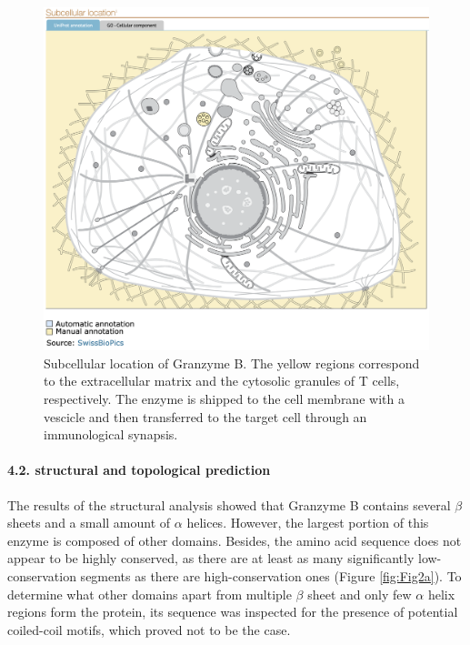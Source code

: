 \documentclass[
]{article}
\begin{document}
\begin{figure}

{\centering \includegraphics[width=0.8\linewidth]{protein identification/subcellular_location} 

}

\caption{Subcellular location of Granzyme B. The yellow regions correspond to the extracellular matrix and the cytosolic granules of T cells, respectively. The enzyme is shipped to the cell membrane with a vescicle and then transferred to the target cell through an immunological synapsis.}\label{fig:Fig1c}
\end{figure}

\hypertarget{structural-and-topological-prediction}{%
\paragraph{4.2. structural and topological prediction}\label{structural-and-topological-prediction}}

The results of the structural analysis showed that Granzyme B contains several \(\beta\) sheets and a small amount of \(\alpha\) helices. However, the largest portion of this enzyme is composed of other domains. Besides, the amino acid sequence does not appear to be highly conserved, as there are at least as many significantly low-conservation segments as there are high-conservation ones (Figure \ref{fig:Fig2a}). To determine what other domains apart from multiple \(\beta\) sheet and only few \(\alpha\) helix regions form the protein, its sequence was inspected for the presence of potential coiled-coil motifs, which proved not to be the case.
\end{document}
